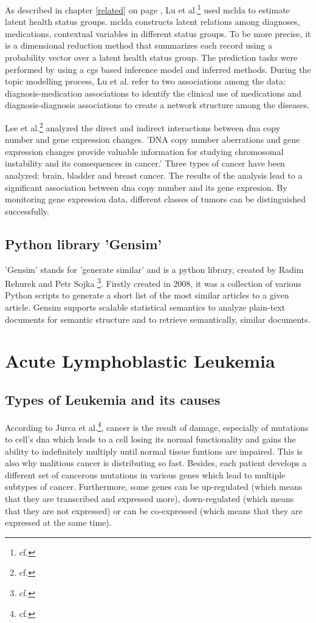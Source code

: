 As described in chapter \ref{related} on page \pageref{related}, Lu et al.\footnote{cf.\autocite{lu_2016}} used \ac{mclda} to estimate latent health status groups. \ac{mclda} constructs latent relations among diagnoses, medications, contextual variables in different status groups. To be more precise, it is a dimensional reduction method that summarizes each record using a probability vector over a latent health status group. The prediction tasks were performed by using a \ac{cgs} based inference model and inferred methods. 
During the topic modelling process, Lu et al. refer to two associations among the data: diagnosis-medication associations to identify the clinical use of medications and diagnosis-diagnosis associations to create a network structure among the diseases.

Lee et al.\footnote{cf.\autocite{lee}} analyzed the direct and indirect interactions between \ac{dna} copy number and gene expression changes. 'DNA copy number aberrations and gene expression changes provide valuable information for studying chromosomal instability and its consequences in cancer.' Three types of cancer have been analyzed: brain, bladder and breast cancer. The results of the analysis lead to a significant association between \ac{dna} copy number and its gene expresion. By monitoring gene expression data, different classes of tumors can be distinguished successfully.
  
\section{Python library 'Gensim'}\label{gensim}
'Gensim' stands for 'generate similar' and is a python library, created by Radim Rehurek and Petr Sojka \footnote{cf.\autocite{gensim}}. Firstly created in  2008, it was a collection of various Python scripts to generate a short list of the most similar articles to a given article. Gensim supports scalable statistical semantics to analyze plain-text documents for semantic structure and to retrieve semantically, similar documents.            
              
\chapter{Acute Lymphoblastic Leukemia}\label{all}
\section{Types of Leukemia and its causes}\label{leukemia_types}
According to Jurca et al.\footnote{cf.\autocite{jurca_2016}}, cancer is the result of damage, especially of mutations to cell's \ac{dna} which leads to a cell losing its normal functionality and gains the ability to indefinitely multiply until normal tissue funtions are impaired. This is also why malitious cancer is distributing so fast. Besides, each patient develops a different set of cancerous mutations in various genes which lead to multiple subtypes of cancer.
Furthermore, some genes can be up-regulated (which means that they are transcribed and expressed more), down-regulated (which means that they are not expressed) or can be co-expressed (which means that they are expressed at the same time).

